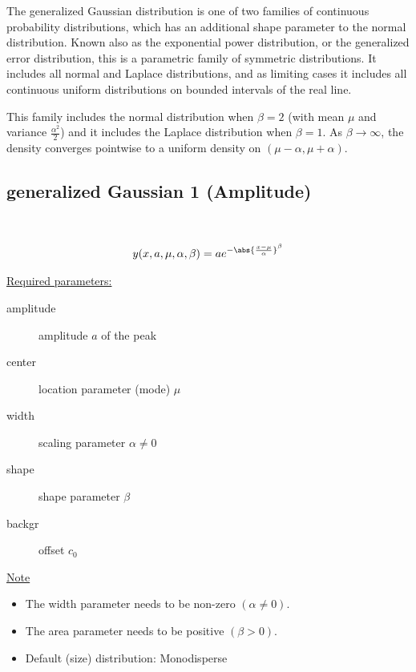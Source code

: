 The generalized Gaussian distribution is one of two families of
continuous probability distributions, which has an additional shape
parameter to the normal distribution. Known also as the exponential
power distribution, or the generalized error distribution, this is a
parametric family of symmetric distributions. It includes all normal
and Laplace distributions, and as limiting cases it includes all
continuous uniform distributions on bounded intervals of the real
line.

This family includes the normal distribution when $\beta=2$ (with
mean $\mu$ and variance $\frac{\alpha^2}{2}$) and it includes the
Laplace distribution when $\beta=1$. As $\beta\rightarrow\infty$,
the density converges pointwise to a uniform density on $
(\mu-\alpha,\mu+\alpha)$.

\clearpage
\subsection{generalized Gaussian 1 (Amplitude)} ~\\
\label{sec:generalizedGaussian1Amplitude}

\begin{align}
y(x,a,\mu,\alpha,\beta) = a e^{-\abs{\frac{x-\mu}{\alpha}}^\beta}
\end{align}

\underline{Required parameters:}
\begin{description}
    \item[amplitude] amplitude $a$ of the peak
    \item[center] location parameter (mode) $\mu$
    \item[width] scaling parameter $\alpha \neq 0$
    \item[shape] shape parameter $\beta$
    \item[backgr] offset $c_0$
\end{description}

\underline{Note}
\begin{itemize}
  \item The width parameter needs to be non-zero $(\alpha\neq 0)$.
  \item The area parameter needs to be positive $(\beta> 0)$.
  \item Default (size) distribution: Monodisperse
\end{itemize}

